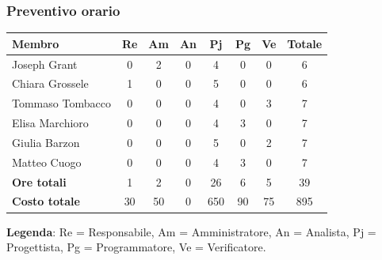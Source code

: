 \documentclass[11pt,a4paper]{article}
\begin{document}
\subsubsection{Preventivo orario}
\begin{center}
    \begin{tabular}{|l|c|c|c|c|c|c|c|}
        \hline
        \textbf{Membro} & \textbf{Re} & \textbf{Am} & \textbf{An} & \textbf{Pj} & \textbf{Pg} & \textbf{Ve} & \textbf{Totale} \\
        \hline
        Joseph Grant & 0 & 2 & 0 & 4 & 0 & 0 & 6 \\
        \hline
        Chiara Grossele & 1 & 0 & 0 & 5 & 0 & 0 & 6 \\
        \hline
        Tommaso Tombacco & 0 & 0 & 0 & 4 & 0 & 3 & 7 \\
        \hline
        Elisa Marchioro & 0 & 0 & 0 & 4 & 3 & 0 & 7 \\
        \hline
        Giulia Barzon & 0 & 0 & 0 & 5 & 0 & 2 & 7 \\
        \hline
        Matteo Cuogo & 0 & 0 & 0 & 4 & 3 & 0 & 7 \\
        \hline
        \textbf{Ore totali} & 1 & 2 & 0 & 26 & 6 & 5 & 39 \\
        \hline
        \textbf{Costo totale} & 30 & 50 & 0 & 650 & 90 & 75 & 895 \\
        \hline
    \end{tabular}
\end{center}

\noindent \textbf{Legenda}: Re = Responsabile, Am = Amministratore, An = Analista, Pj = Progettista, Pg = Programmatore, Ve = Verificatore.
\end{document}
